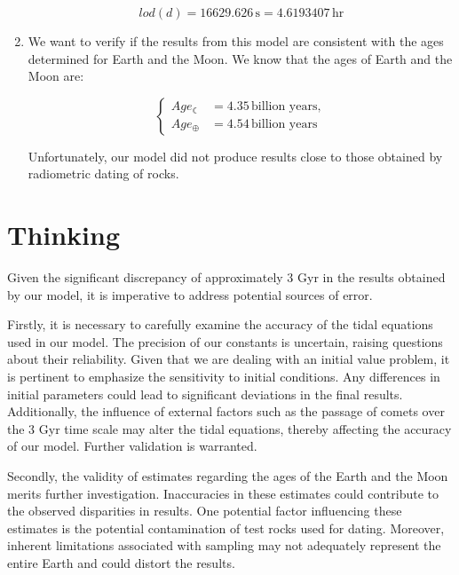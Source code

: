 \documentclass[12pt, letterpaper] {article}
\begin{document}
\begin{enumerate}
    \begin{equation}
        {lod(d) = 16629.626\, \text{s} = 4.6193407\, \text{hr}}
    \end{equation}
    
    \item We want to verify if the results from this model are consistent with the ages determined for Earth and the Moon. We know that the ages of Earth and the Moon are:

    \begin{equation}
        \begin{cases}
            Age_{\leftmoon} &= 4.35\, \text{billion years}, \\
            Age_{\oplus} &= 4.54\, \text{billion years}
        \end{cases}
    \end{equation}

    Unfortunately, our model did not produce results close to those obtained by radiometric dating of rocks.
 
\end{enumerate}

\section{Thinking}
Given the significant discrepancy of approximately 3 Gyr in the results obtained by our model, it is imperative to address potential sources of error.

Firstly, it is necessary to carefully examine the accuracy of the tidal equations used in our model. The precision of our constants is uncertain, raising questions about their reliability. Given that we are dealing with an initial value problem, it is pertinent to emphasize the sensitivity to initial conditions. Any differences in initial parameters could lead to significant deviations in the final results. Additionally, the influence of external factors such as the passage of comets over the 3 Gyr time scale may alter the tidal equations, thereby affecting the accuracy of our model. Further validation is warranted.

Secondly, the validity of estimates regarding the ages of the Earth and the Moon merits further investigation. Inaccuracies in these estimates could contribute to the observed disparities in results. One potential factor influencing these estimates is the potential contamination of test rocks used for dating. Moreover, inherent limitations associated with sampling may not adequately represent the entire Earth and could distort the results.
\end{document}
